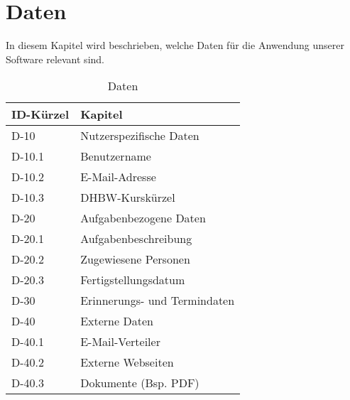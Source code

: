 
\chapter{Daten}

In diesem Kapitel wird beschrieben, welche Daten für die Anwendung unserer Software relevant sind.\\

\begin{table}[H]
    \caption{Daten}
    \label{einleitung:kapitel}
    \begin{tabularx}{\textwidth}{|l|X|}
        \toprule
        \textbf{ID-Kürzel} & \textbf{Kapitel} \\
        \endhead
        \hline
        D-10 & Nutzerspezifische Daten \\
        D-10.1 & Benutzername \\
        D-10.2 & E-Mail-Adresse \\
        D-10.3 & DHBW-Kurskürzel\\
        \hline
        D-20 & Aufgabenbezogene Daten \\
        D-20.1 & Aufgabenbeschreibung \\
        D-20.2 & Zugewiesene Personen \\
        D-20.3 & Fertigstellungsdatum \\
        \hline        
        D-30 & Erinnerungs- und Termindaten \\
        \hline
        D-40 & Externe Daten \\
        D-40.1 & E-Mail-Verteiler \\
        D-40.2 & Externe Webseiten \\
        D-40.3 & Dokumente (Bsp. PDF)\\
        \hline
    \end{tabularx}
\end{table}


